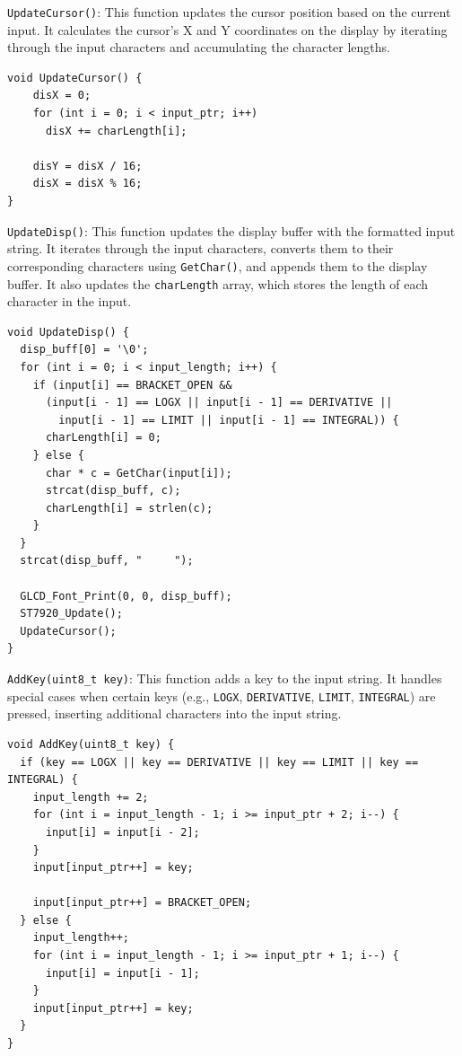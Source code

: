 \documentclass[a4paper, twoside]{report}
\begin{document}
\texttt{UpdateCursor()}: This function updates the cursor position based on the current input. It calculates the cursor's X and Y coordinates on the display by iterating through the input characters and accumulating the character lengths.
\begin{verbatim}
void UpdateCursor() {
    disX = 0;
    for (int i = 0; i < input_ptr; i++)
      disX += charLength[i];

    disY = disX / 16;
    disX = disX % 16;
}
\end{verbatim}

\texttt{UpdateDisp()}: This function updates the display buffer with the formatted input string. It iterates through the input characters, converts them to their corresponding characters using \texttt{GetChar()}, and appends them to the display buffer. It also updates the \texttt{charLength} array, which stores the length of each character in the input.
\begin{verbatim}
void UpdateDisp() {
  disp_buff[0] = '\0';
  for (int i = 0; i < input_length; i++) {
    if (input[i] == BRACKET_OPEN &&
      (input[i - 1] == LOGX || input[i - 1] == DERIVATIVE ||
        input[i - 1] == LIMIT || input[i - 1] == INTEGRAL)) {
      charLength[i] = 0;
    } else {
      char * c = GetChar(input[i]);
      strcat(disp_buff, c);
      charLength[i] = strlen(c);
    }
  }
  strcat(disp_buff, "     ");

  GLCD_Font_Print(0, 0, disp_buff);
  ST7920_Update();
  UpdateCursor();
}
\end{verbatim}

\texttt{AddKey(uint8_t key)}: This function adds a key to the input string. It handles special cases when certain keys (e.g., \texttt{LOGX}, \texttt{DERIVATIVE}, \texttt{LIMIT}, \texttt{INTEGRAL}) are pressed, inserting additional characters into the input string.
\begin{verbatim}
void AddKey(uint8_t key) {
  if (key == LOGX || key == DERIVATIVE || key == LIMIT || key == INTEGRAL) {
    input_length += 2;
    for (int i = input_length - 1; i >= input_ptr + 2; i--) {
      input[i] = input[i - 2];
    }
    input[input_ptr++] = key;

    input[input_ptr++] = BRACKET_OPEN;
  } else {
    input_length++;
    for (int i = input_length - 1; i >= input_ptr + 1; i--) {
      input[i] = input[i - 1];
    }
    input[input_ptr++] = key;
  }
}
\end{verbatim}
\end{document}

